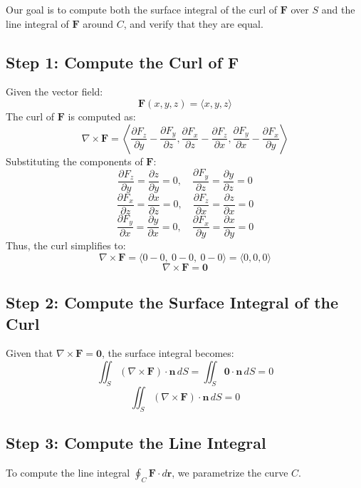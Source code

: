 \documentclass[11pt]{article}
\begin{document}
Our goal is to compute both the surface integral of the curl of \( \mathbf{F} \) over \( S \) and the line integral of \( \mathbf{F} \) around \( C \), and verify that they are equal.

\newpage

\subsection{Step 1: Compute the Curl of \( \mathbf{F} \)}

Given the vector field:
\[
\mathbf{F}(x, y, z) = \langle x, y, z \rangle
\]
The curl of \( \mathbf{F} \) is computed as:
\[
\nabla \times \mathbf{F} = \left\langle \frac{\partial F_z}{\partial y} - \frac{\partial F_y}{\partial z}, \frac{\partial F_x}{\partial z} - \frac{\partial F_z}{\partial x}, \frac{\partial F_y}{\partial x} - \frac{\partial F_x}{\partial y} \right\rangle
\]
Substituting the components of \( \mathbf{F} \):
\[
\frac{\partial F_z}{\partial y} = \frac{\partial z}{\partial y} = 0, \quad \frac{\partial F_y}{\partial z} = \frac{\partial y}{\partial z} = 0
\]
\[
\frac{\partial F_x}{\partial z} = \frac{\partial x}{\partial z} = 0, \quad \frac{\partial F_z}{\partial x} = \frac{\partial z}{\partial x} = 0
\]
\[
\frac{\partial F_y}{\partial x} = \frac{\partial y}{\partial x} = 0, \quad \frac{\partial F_x}{\partial y} = \frac{\partial x}{\partial y} = 0
\]
Thus, the curl simplifies to:
\[
\nabla \times \mathbf{F} = \langle 0 - 0, \ 0 - 0, \ 0 - 0 \rangle = \langle 0, 0, 0 \rangle
\]
\[
\boxed{ \nabla \times \mathbf{F} = \mathbf{0} }
\]

\newpage

\subsection{Step 2: Compute the Surface Integral of the Curl}

Given that \( \nabla \times \mathbf{F} = \mathbf{0} \), the surface integral becomes:
\[
\iint_{S} (\nabla \times \mathbf{F}) \cdot \mathbf{n} \, dS = \iint_{S} \mathbf{0} \cdot \mathbf{n} \, dS = 0
\]
\[
\boxed{ \iint_{S} (\nabla \times \mathbf{F}) \cdot \mathbf{n} \, dS = 0 }
\]

\newpage

\subsection{Step 3: Compute the Line Integral}

To compute the line integral \( \oint_{C} \mathbf{F} \cdot d\mathbf{r} \), we parametrize the curve \( C \).
\end{document}
